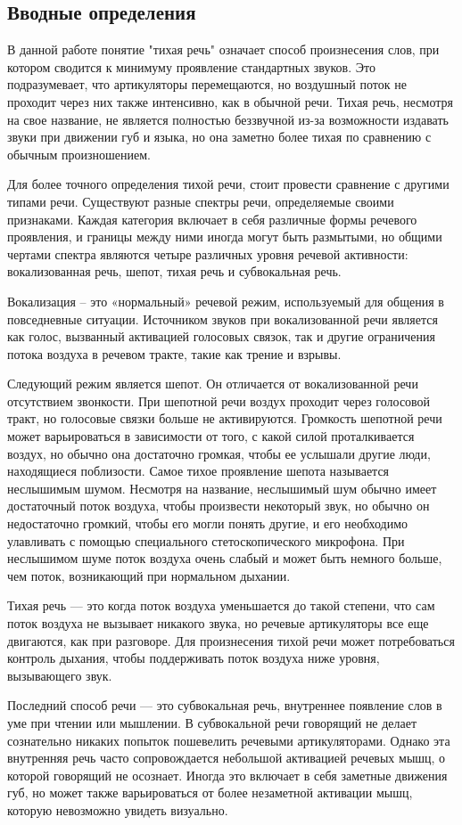 \subsection{Вводные определения}

В данной работе понятие "тихая речь" означает способ произнесения слов, при котором сводится к минимуму проявление стандартных звуков. Это подразумевает, что артикуляторы перемещаются, но воздушный поток не проходит через них также интенсивно, как в обычной речи. Тихая речь, несмотря на свое название, не является полностью беззвучной из-за возможности издавать звуки при движении губ и языка, но она заметно более тихая по сравнению с обычным произношением.

Для более точного определения тихой речи, стоит провести сравнение с другими типами речи. Существуют разные спектры речи, определяемые своими признаками. Каждая категория включает в себя различные формы речевого проявления, и границы между ними иногда могут быть размытыми, но общими чертами спектра являются четыре различных уровня речевой активности: вокализованная речь, шепот, тихая речь и субвокальная речь.

Вокализация – это «нормальный» речевой режим, используемый для общения в повседневные ситуации. Источником звуков при вокализованной речи является как голос, вызванный активацией голосовых связок, так и другие ограничения потока воздуха в речевом тракте, такие как трение и взрывы.

Следующий режим является шепот. Он отличается от вокализованной речи отсутствием звонкости. При шепотной речи воздух проходит через голосовой тракт, но голосовые связки больше не активируются. Громкость шепотной речи может варьироваться в зависимости от того, с какой силой проталкивается воздух, но обычно она достаточно громкая, чтобы ее услышали другие люди, находящиеся поблизости. Самое тихое проявление шепота называется неслышимым шумом. Несмотря на название, неслышимый шум обычно имеет достаточный поток воздуха, чтобы произвести некоторый звук, но обычно он недостаточно громкий, чтобы его могли понять другие, и его необходимо улавливать с помощью специального стетоскопического микрофона. При неслышимом шуме поток воздуха очень слабый и может быть немного больше, чем поток, возникающий при нормальном дыхании.

Тихая речь — это когда поток воздуха уменьшается до такой степени, что сам поток воздуха не вызывает никакого звука, но речевые артикуляторы все еще двигаются, как при разговоре. Для произнесения тихой речи может потребоваться контроль дыхания, чтобы поддерживать поток воздуха ниже уровня, вызывающего звук.

Последний способ речи — это субвокальная речь, внутреннее появление слов в уме при чтении или мышлении. В субвокальной речи говорящий не делает сознательно никаких попыток пошевелить речевыми артикуляторами. Однако эта внутренняя речь часто сопровождается небольшой активацией речевых мышц, о которой говорящий не осознает. Иногда это включает в себя заметные движения губ, но может также варьироваться от более незаметной активации мышц, которую невозможно увидеть визуально.
